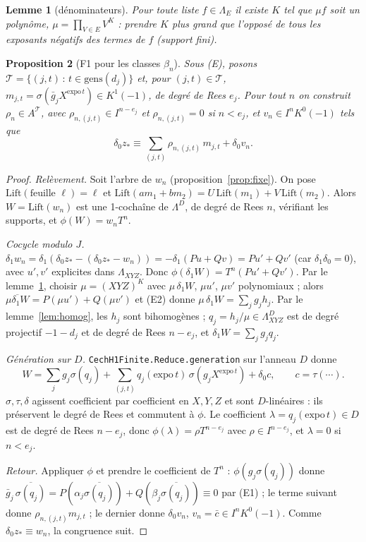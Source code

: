 \documentclass[11pt]{amsart}
\newtheorem{proposition}{Proposition}
\newtheorem{lemma}[proposition]{Lemme}
\theoremstyle{remark}
\newcommand{\La}{\Lambda}
\begin{document}
\begin{lemma}[dénominateurs]\label{lem:denom}
Pour toute liste $f\in\La_E$ il existe $K$ tel que $\mu f$ soit un
polynôme, $\mu=\prod_{V\in E}V^K$ : prendre $K$ plus grand que l'opposé
de tous les exposants négatifs des termes de $f$ (support fini).
\end{lemma}

\begin{proposition}[F1 pour les classes $\beta_n$]\label{prop:F1}
Sous (E), posons $\mathcal T=\{(j,t)\,:\,t\in\mathrm{gens}(d_j)\}$ et,
pour $(j,t)\in\mathcal T$, $m_{j,t}=\sigma(\bar g_jX^{\mathrm{expo}\,t})
\in K^1(-1)$, de degré de Rees $e_j$. Pour tout $n$ on construit
$\rho_n\in A^{\mathcal T}$, avec $\rho_{n,(j,t)}\in I^{n-e_j}$ et
$\rho_{n,(j,t)}=0$ si $n<e_j$, et $v_n\in I^nK^0(-1)$ tels que
\[
 \delta_0z_*\equiv\sum_{(j,t)}\rho_{n,(j,t)}\,m_{j,t}+\delta_0v_n .
\]
\end{proposition}
\begin{proof}
\emph{Relèvement.} Soit l'arbre de $w_n$ (proposition~\ref{prop:fixe}).
On pose $\mathrm{Lift}(\text{feuille }\ell)=\ell$ et
$\mathrm{Lift}(am_1+bm_2)=U\,\mathrm{Lift}(m_1)+V\,\mathrm{Lift}(m_2)$.
Alors $W=\mathrm{Lift}(w_n)$ est une 1-cochaîne de $\La^D$, de degré de
Rees $n$, vérifiant les supports, et $\phi(W)=w_nT^n$.

\emph{Cocycle modulo $J$.} $\delta_1w_n=\delta_1(\delta_0z_*-(\delta_0z_*-w_n))
=-\delta_1(Pu+Qv)=Pu'+Qv'$ (car $\delta_1\delta_0=0$), avec $u',v'$
explicites dans $\La_{XYZ}$. Donc $\phi(\delta_1W)=T^n(Pu'+Qv')$. Par le
lemme~\ref{lem:denom}, choisir $\mu=(XYZ)^K$ avec $\mu\,\delta_1W$,
$\mu u'$, $\mu v'$ polynomiaux ; alors
$\overline{\mu\delta_1W}=P(\mu u')+Q(\mu v')$ et (E2) donne
$\mu\,\delta_1W=\sum_jg_jh_j$. Par le lemme~\ref{lem:homog}, les $h_j$
sont bihomogènes ; $q_j=h_j/\mu\in\La^D_{XYZ}$ est de degré projectif
$-1-d_j$ et de degré de Rees $n-e_j$, et $\delta_1W=\sum_jg_jq_j$.

\emph{Génération sur $D$.} \texttt{CechH1Finite.Reduce.generation} sur
l'anneau $D$ donne
\[
 W=\sum_jg_j\sigma(q_j)
   +\sum_{(j,t)}q_j(\mathrm{expo}\,t)\,\sigma(g_jX^{\mathrm{expo}\,t})
   +\delta_0c ,\qquad c=\tau(\cdots).
\]
$\sigma,\tau,\delta$ agissent coefficient par coefficient en $X,Y,Z$ et
sont $D$-linéaires : ils préservent le degré de Rees et commutent à
$\phi$. Le coefficient $\lambda=q_j(\mathrm{expo}\,t)\in D$ est de degré
de Rees $n-e_j$, donc $\phi(\lambda)=\rho T^{n-e_j}$ avec
$\rho\in I^{n-e_j}$, et $\lambda=0$ si $n<e_j$.

\emph{Retour.} Appliquer $\phi$ et prendre le coefficient de $T^n$ :
$\phi(g_j\sigma(q_j))$ donne $\bar g_j\,\overline{\sigma(q_j)}
=P(\alpha_j\overline{\sigma(q_j)})+Q(\beta_j\overline{\sigma(q_j)})
\equiv0$ par (E1) ; le terme suivant donne $\rho_{n,(j,t)}m_{j,t}$ ; le
dernier donne $\delta_0v_n$, $v_n=\bar c\in I^nK^0(-1)$. Comme
$\delta_0z_*\equiv w_n$, la congruence suit.
\end{proof}
\end{document}
